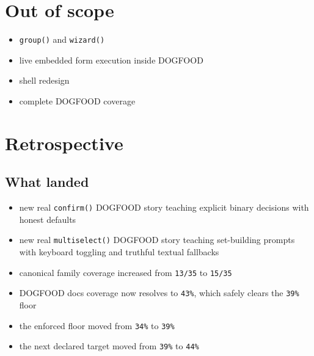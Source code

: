 \section{Out of scope}\label{record-071-out-of-scope}

\begin{itemize}
\tightlist
\item
  \texttt{g\allowbreak{}r\allowbreak{}o\allowbreak{}u\allowbreak{}p\allowbreak{}(\allowbreak{})} and \texttt{w\allowbreak{}i\allowbreak{}z\allowbreak{}a\allowbreak{}r\allowbreak{}d\allowbreak{}(\allowbreak{})}
\item
  live embedded form execution inside DOGFOOD
\item
  shell redesign
\item
  complete DOGFOOD coverage
\end{itemize}

\section{Retrospective}\label{record-071-retrospective}

\subsection{What landed}\label{record-071-what-landed}

\begin{itemize}
\tightlist
\item
  new real \texttt{c\allowbreak{}o\allowbreak{}n\allowbreak{}f\allowbreak{}i\allowbreak{}r\allowbreak{}m\allowbreak{}(\allowbreak{})} DOGFOOD story teaching explicit binary decisions with honest defaults
\item
  new real \texttt{m\allowbreak{}u\allowbreak{}l\allowbreak{}t\allowbreak{}i\allowbreak{}s\allowbreak{}e\allowbreak{}l\allowbreak{}e\allowbreak{}c\allowbreak{}t\allowbreak{}(\allowbreak{})} DOGFOOD story teaching set-building prompts with keyboard toggling and truthful textual fallbacks
\item
  canonical family coverage increased from \texttt{1\allowbreak{}3\allowbreak{}/\allowbreak{}3\allowbreak{}5} to \texttt{1\allowbreak{}5\allowbreak{}/\allowbreak{}3\allowbreak{}5}
\item
  DOGFOOD docs coverage now resolves to \texttt{4\allowbreak{}3\allowbreak{}\%}, which safely clears the \texttt{3\allowbreak{}9\allowbreak{}\%} floor
\item
  the enforced floor moved from \texttt{3\allowbreak{}4\allowbreak{}\%} to \texttt{3\allowbreak{}9\allowbreak{}\%}
\item
  the next declared target moved from \texttt{3\allowbreak{}9\allowbreak{}\%} to \texttt{4\allowbreak{}4\allowbreak{}\%}
\end{itemize}

